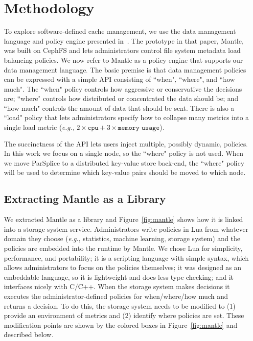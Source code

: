 \section{Methodology}

To explore software-defined cache management, we use the data management
language and policy engine presented in~\cite{sevilla:sc15-mantle}. The
prototype in that paper, Mantle, was built on CephFS and lets administrators
control file system metadata load balancing policies.  We now refer to Mantle
as a policy engine that supports our data management language.  The basic
premise is that data management policies can be expressed with a simple API
consisting of ``when", ``where", and ``how much". The ``when" policy controls
how aggressive or conservative the decisions are; ``where" controls how
distributed or concentrated the data should be; and ``how much" controls the
amount of data that should be sent. There is also a ``load" policy that lets
administrators specify how to collapse many metrics into a single load metric
({\it e.g.}, \(2\times\texttt{cpu} + 3\times\texttt{memory usage}\)).

The succinctness of the API lets users inject multiple, possibly dynamic, policies. In
this work we focus on a single node, so the ``where" policy is not used. When
we move ParSplice to a distributed key-value store back-end, the ``where" policy
will be used to determine which key-value pairs should be moved to which node.

\subsection{Extracting Mantle as a Library}
\label{sec:extracting}

We extracted Mantle as a library and Figure~\ref{fig:mantle} shows how it is
linked into a storage system service.  Administrators write policies in Lua from whatever
domain they choose ({\it e.g.}, statistics, machine learning, storage system)
and the policies are embedded into the runtime by Mantle.  We chose Lua for
simplicity, performance, and portability; it is a scripting language with
simple syntax, which allows administrators to focus on the policies themselves;
it was designed as an embeddable language, so it is lightweight and does less
type checking; and it interfaces nicely with C/C++.  When the storage system makes
decisions it executes the administrator-defined policies for when/where/how
much and returns a decision.  To do this, the storage system needs to be modified to
(1) provide an environment of metrics and (2) identify where policies are set.
These modification points are shown by the colored boxes in
Figure~\ref{fig:mantle} and described below.

